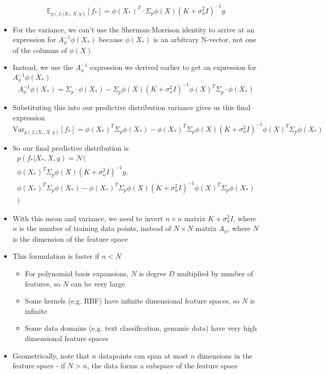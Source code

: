 \documentclass[12pt]{article}
\begin{document}
\begin{itemize}
\begin{equation}
    \mathbb{E}_{p(f_*|X_*,X,y)}[f_*] = \phi(X_*)^T \cdot \Sigma_p\phi(X)(K+\sigma_n^2I)^{-1}y
\end{equation}
    \item For the variance, we can't use the Sherman-Morrison identity to arrive at an expression for $A_{\phi}^{-1}\phi(X_*)$ because $\phi(X_*)$ is an arbitrary N-vector, not one of the columns of $\phi(X)$
    \item Instead, we use the $A_{\phi}^{-1}$ expression we derived earlier to get an expression for $A_{\phi}^{-1}\phi(X_*)$
\begin{equation}
    A_{\phi}^{-1}\phi(X_*) = \Sigma_p \cdot \phi(X_*) - \Sigma_p\phi(X)(K+\sigma_n^2I)^{-1}\phi(X)^T\Sigma_p \cdot \phi(X_*)
\end{equation}
    \item Substituting this into our predictive distribution variance gives us this final expression
\begin{equation}
    \text{Var}_{p(f_*|X_*,X,y)}[f_*] = \phi(X_*)^T\Sigma_p\phi(X_*) - \phi(X_*)^T\Sigma_p\phi(X)(K+\sigma_n^2I)^{-1}\phi(X)^T\Sigma_p\phi(X_*)
\end{equation}
    \item So our final predictive distribution is
\begin{equation*}
    \begin{aligned}
        p(f_*|X_*,X,y) = \mathcal{N}( \\
        \phi(X_*)^T\Sigma_p\phi(X)(K+\sigma_n^2I)^{-1}y , \\
        \phi(X_*)^T\Sigma_p\phi(X_*) - \phi(X_*)^T\Sigma_p\phi(X)(K+\sigma_n^2I)^{-1}\phi(X)^T\Sigma_p\phi(X_*) \\
        )
    \end{aligned}
\end{equation*}
    \item With this mean and variance, we need to invert $n \times n$ matrix $K + \sigma_n^2I$, where $n$ is the number of training data points, instead of $N \times N$ matrix $A_{\phi}$, where $N$ is the dimension of the feature space
    \item This formulation is faster if $n < N$
        \begin{itemize}
            \item For polynomial basis expansions, $N$ is degree $D$ multiplied by number of features, so $N$ can be very large
            \item Some kernels (e.g. RBF) have infinite dimensional feature spaces, so $N$ is infinite
            \item Some data domains (e.g. text classification, genomic data) have very high dimensional feature spaces
        \end{itemize}
    \item Geometrically, note that $n$ datapoints can span at most $n$ dimensions in the feature space - if $N > n$, the data forms a subspace of the feature space
\end{itemize}
\end{document}
